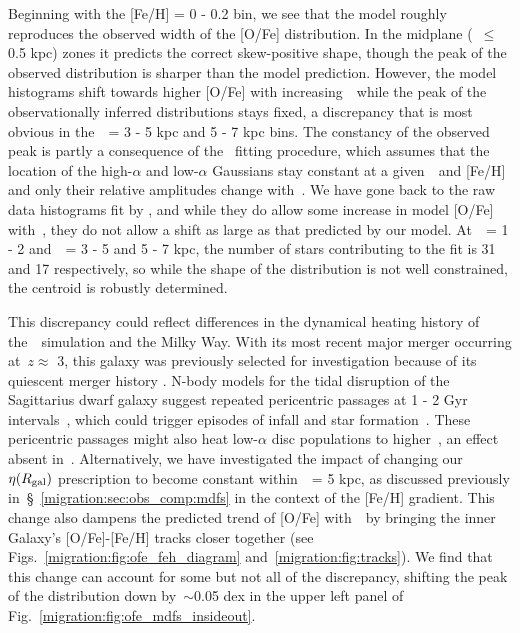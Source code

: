 Beginning with the [Fe/H] = 0 - 0.2 bin, we see that the model roughly 
reproduces the observed width of the [O/Fe] distribution. 
In the midplane (\absz~$\leq$ 0.5 kpc) zones it predicts the correct 
skew-positive shape, though the peak of the observed distribution is sharper 
than the model prediction. However, the model histograms shift towards higher 
[O/Fe] with increasing~\absz~while the peak of the observationally inferred 
distributions stays fixed, a discrepancy that is most obvious in the~\rgal~= 
3 - 5 kpc and 5 - 7 kpc bins. The constancy of the observed peak is partly 
a consequence of the~\citet{Vincenzo2021a} fitting procedure, which assumes 
that the location of the high-$\alpha$ and low-$\alpha$ Gaussians stay 
constant at a given~\rgal~and [Fe/H] and only their relative amplitudes change 
with~\absz. We have gone back to the raw data histograms fit by 
\citet{Vincenzo2021a}, and while they do allow some increase in model [O/Fe] 
with~\absz, they do not allow a shift as large as that predicted by our model. 
At~\absz~= 1 - 2 and~\rgal~= 3 - 5 and 5 - 7 kpc, the number of stars 
contributing to the fit is 31 and 17 respectively, so while the shape of the 
distribution is not well constrained, the centroid is robustly determined. 
\par 
This discrepancy could reflect differences in the dynamical heating history 
of the~\hsim~simulation and the Milky Way. 
With its most recent major merger occurring at~$z \approx$ 3, this galaxy was 
previously selected for investigation because of its quiescent merger history 
\citep[e.g.][]{Zolotov2012}. N-body models for the tidal disruption of the 
Sagittarius dwarf galaxy suggest repeated pericentric passages at 1 - 2 Gyr 
intervals~\citep{Law2010}, which could trigger episodes of infall and star 
formation~\citep[e.g.][]{RuizLara2020}. 
These pericentric passages might also heat low-$\alpha$ disc populations to 
higher~\absz, an effect absent in~\hsim. 
Alternatively, we have investigated the impact of changing our~$\eta(R_\text{gal})$ 
prescription to become constant within~\rgal~= 5 kpc, as discussed previously 
in~\S~\ref{migration:sec:obs_comp:mdfs} in the context of the [Fe/H] gradient. 
This change also dampens the predicted trend of [O/Fe] with~\absz~by bringing 
the inner Galaxy's [O/Fe]-[Fe/H] tracks closer together (see 
Figs.~\ref{migration:fig:ofe_feh_diagram} and~\ref{migration:fig:tracks}). 
We find that this change can account for some but not all of the discrepancy, 
shifting the peak of the distribution down by~$\sim$0.05 dex in the upper left 
panel of Fig.~\ref{migration:fig:ofe_mdfs_insideout}. 
